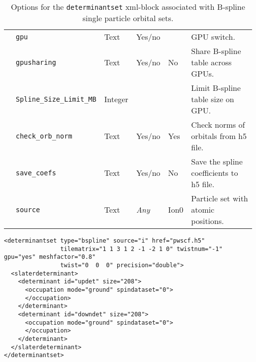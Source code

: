 \begin{table}[h]
\begin{center}
\begin{tabularx}{\textwidth}{l l l l l X }
   &   \texttt{gpu}                     &  Text              &  Yes/no          &                   &  GPU switch. \\
   &   \texttt{gpusharing}              &  Text              &  Yes/no          & No                &  Share B-spline table across GPUs. \\
   &   \texttt{Spline\_Size\_Limit\_MB} &  Integer           &                  &                   &  Limit B-spline table size on GPU. \\
   &   \texttt{check\_orb\_norm}        &  Text              &  Yes/no          & Yes               &  Check norms of orbitals from h5 file. \\
   &   \texttt{save\_coefs}             &  Text              &  Yes/no          & No                &  Save the spline coefficients to h5 file. \\
   &   \texttt{source}                  &  Text              &  \textit{Any}    & Ion0              &  Particle set with atomic positions. \\
  \hline
\end{tabularx}
\end{center}
\caption{Options for the \texttt{determinantset} xml-block associated with B-spline single particle orbital sets.}
\label{table:splineSPOs}
\end{table}


\begin{lstlisting}[style=QMCPXML,caption=Determinant set XML element.\label{listing:splineSPOs}]
<determinantset type="bspline" source="i" href="pwscf.h5"
                tilematrix="1 1 3 1 2 -1 -2 1 0" twistnum="-1" gpu="yes" meshfactor="0.8"
                twist="0  0  0" precision="double">
  <slaterdeterminant>
    <determinant id="updet" size="208">
      <occupation mode="ground" spindataset="0">
      </occupation>
    </determinant>
    <determinant id="downdet" size="208">
      <occupation mode="ground" spindataset="0">
      </occupation>
    </determinant>
  </slaterdeterminant>
</determinantset>
\end{lstlisting}

